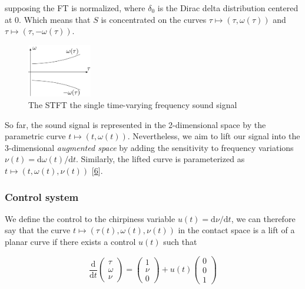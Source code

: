 \documentclass[american,]{article}
\theoremstyle{definition}
\theoremstyle{definition}
\theoremstyle{definition}
\theoremstyle{remark}
\begin{document}
supposing the FT is normalized, where \(\delta_0\) is the Dirac delta
distribution centered at 0.
Which means that \(S\) is concentrated on the curves \(\tau\mapsto(\tau,\omega(\tau))\)
and \(\tau\mapsto(\tau,-\omega(\tau))\).

\begin{figure}
\centering
\includegraphics[width=0.25\textwidth,height=\textheight]{img/single_freq.png}
\caption{The STFT the single time-varying frequency sound signal}
\end{figure}

So far, the sound signal is represented in the 2-dimensional space
by the parametric curve \(t\mapsto(t,\omega(t))\).
Nevertheless, we aim to lift our signal into the 3-dimensional \emph{augmented space}
by adding the sensitivity to frequency variations \(\nu(t)=\mathrm{d}\omega(t)/\mathrm{d}t\).
Similarly, the lifted curve is parameterized as \(t\mapsto(t,\omega(t),\nu(t))\) {[}\protect\hyperlink{ref-boscain2021}{6}{]}.

\hypertarget{control-system}{%
\subsubsection{Control system}\label{control-system}}

We define the control to the chirpiness variable \(u(t)=\mathrm{d}\nu/\mathrm{d}t\),
we can therefore say that the curve \(t\mapsto(\tau(t),\omega(t),\nu(t))\)
in the contact space is a lift of a planar curve if there exists
a control \(u(t)\) such that

\begin{equation}
\frac{\mathrm{d}}{\mathrm{d}t}\begin{pmatrix}\tau\\\omega\\\nu\end{pmatrix} = \begin{pmatrix}1\\\nu\\0\end{pmatrix} + u(t)\begin{pmatrix}0\\0\\1\end{pmatrix}
\end{equation}
\end{document}
